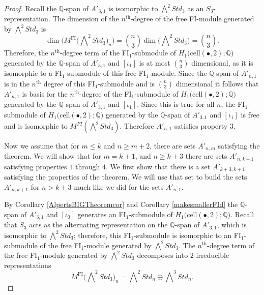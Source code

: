 \documentclass[12py]{amsart}%
\theoremstyle{definition}\newtheorem{definition}[thm]{Definition}
\theoremstyle{definition}
\newcommand{\Q}{\ensuremath{\mathbb{Q}}}
\begin{document}
\begin{proof}
Recall the $\Q$-span of $A'_{3,1}$ is isomorphic to $\bigwedge^{2}Std_{3}$ as an $S_{3}$-representation. The dimension of the $n^{\text{th}}$-degree of the free FI-module generated by $\bigwedge^{2}Std_{3}$ is 
\[
\dim\bigg(M^{\text{FI}}\Big(\bigwedge\nolimits^{2}Std_{3}\Big)_{n}\bigg)=\binom{n}{3}\dim\big(\bigwedge\nolimits^{2}Std_{3}\big)=\binom{n}{3}.
\]
Therefore, the $n^{\text{th}}$-degree term of the FI$_{1}$-submodule of $H_{1}\big(\text{cell}(\bullet, 2);\Q\big)$ generated by the $\Q$-span of $A'_{3,1}$ and $[\iota_{1}]$ is at most $\binom{n}{3}$ dimensional, as it is isomorphic to a FI$_{1}$-submodule of this free FI$_{1}$-module. Since the $\Q$-span of $A'_{n, 1}$ is in the $n^{\text{th}}$ degree of this FI$_{1}$-submodule and is $\binom{n}{3}$ dimensional it follows that $A'_{n,1}$ is basis for the $n^{\text{th}}$-degree of the FI$_{1}$-submodule of $H_{1}\big(\text{cell}(\bullet, 2);\Q\big)$ generated by the $\Q$-span of $A'_{3,1}$ and $[\iota_{1}]$. Since this is true for all $n$, the FI$_{1}$-submodule of $H_{1}\big(\text{cell}(\bullet, 2);\Q\big)$ generated by the $\Q$-span of $A'_{3,1}$ and $[\iota_{1}]$ is free and is isomorphic to $M^{FI}(\bigwedge^{2}Std_{3})$. Therefore $A'_{n,1}$ satisfies property $3$.


Now we assume that for $m\le k$ and $n\ge m+2$, there are sets $A'_{n,m}$ satisfying the theorem. We will show that for $m=k+1$, and $n\ge k+3$ there are sets $A'_{n,k+1}$ satisfying properties $1$ through $4$. We first show that there is a set $A'_{k+3,k+1}$ satisfying the properties of the theorem. We will use that set to build the sets $A'_{n,k+1}$ for $n>k+3$ much like we did for the sets $A'_{n,1}$.

By Corollary \ref{AlpertsBIGTheoremcor} and Corollary \ref{makesmallerFId} the $\Q$-span of $A'_{3,1}$ and $[\iota_{0}]$ generates an FI$_{1}$-submodule of $H_{1}\big(\text{cell}(\bullet, 2);\Q\big)$. Recall that $S_{3}$ acts as the alternating representation on the $\Q$-span of $A'_{3,1}$, which is isomorphic to $\bigwedge^{2}Std_{3}$; therefore, this FI$_{1}$-submodule is isomorphic to an FI$_{1}$-submodule of the free FI$_{1}$-module generated by $\bigwedge^{2}Std_{3}$. The $n^{\text{th}}$-degree term of the free FI$_{1}$-module generated by $\bigwedge^{2}Std_{3}$ decomposes into $2$ irreducible representations
\[
M^{\text{FI}}\Big(\bigwedge\nolimits^{2}Std_{3}\Big)_{n}=\bigwedge\nolimits^{2}Std_{n}\oplus \bigwedge\nolimits^{3}Std_{n}.
\]


\end{proof}
\end{document}
